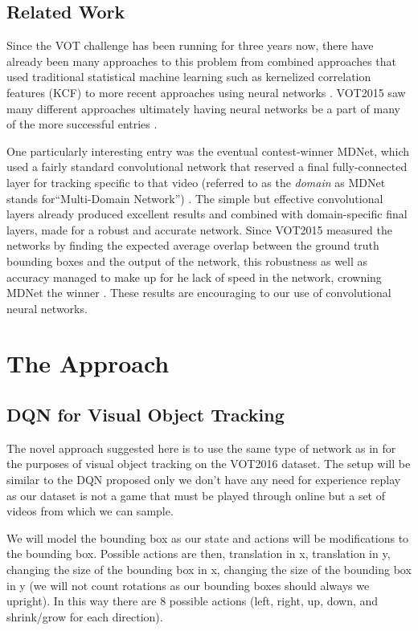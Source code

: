 \documentclass[letterpaper,12pt,titlepage,oneside,final]{book}
\begin{document}
\section{Related Work}

Since the VOT challenge has been running for three years now, there have already been many approaches to this problem from combined approaches that used traditional statistical machine learning such as kernelized correlation features (KCF) \cite{kcf} to more recent approaches using neural networks \cite{mdnet}. VOT2015 saw many different approaches ultimately having neural networks be a part of many of the more successful entries \cite{vot2015}.

One particularly interesting entry was the eventual contest-winner MDNet, which used a fairly standard convolutional network that reserved a final fully-connected layer for tracking specific to that video (referred to as the \textit{domain} as MDNet stands for``Multi-Domain Network'') \cite{mdnet}. The simple but effective convolutional layers already produced excellent results and combined with domain-specific final layers, made for a robust and accurate network. Since VOT2015 measured the networks by finding the expected average overlap between the ground truth bounding boxes and the output of the network, this robustness as well as accuracy managed to make up for he lack of speed in the network, crowning MDNet the winner \cite{vot2015}. These results are encouraging to our use of convolutional neural networks.


\chapter{The Approach}
\section{DQN for Visual Object Tracking}
The novel approach suggested here is to use the same type of network as in \cite{atari-dqn} for the purposes of visual object tracking on the VOT2016 dataset. The setup will be similar to the DQN proposed only we don't have any need for experience replay as our dataset is not a game that must be played through online but a set of videos from which we can sample. 

We will model the bounding box as our state and actions will be modifications to the bounding box. Possible actions are then, translation in x, translation in y, changing the size of the bounding box in x, changing the size of the bounding box in y (we will not count rotations as our bounding boxes should always we upright). In this way there are 8 possible actions (left, right, up, down, and shrink/grow for each direction).
\end{document}
